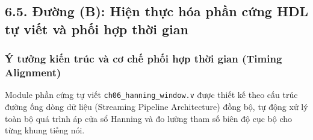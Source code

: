 \subsection*{6.5. Đường (B): Hiện thực hóa phần cứng HDL tự viết và phối hợp thời gian}

\subsubsection*{Ý tưởng kiến trúc và cơ chế phối hợp thời gian (Timing Alignment)}
Module phần cứng tự viết \texttt{ch06\_hanning\_window.v} được thiết kế theo cấu trúc đường ống dòng dữ liệu (Streaming Pipeline Architecture) đồng bộ, tự động xử lý toàn bộ quá trình áp cửa sổ Hanning và đo lường tham số biên độ cục bộ cho từng khung tiếng nói.

